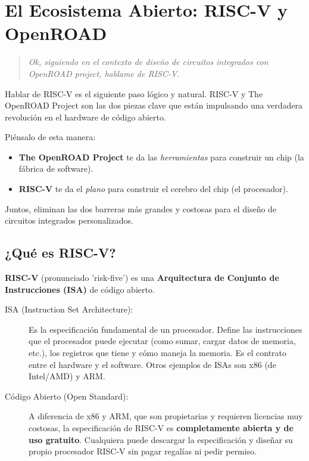 \documentclass[12pt,a4paper]{article}
\newenvironment{pregunta}
  {\begin{leftbar}\begin{quote}\itshape}
  {\end{quote}\end{leftbar}}
\begin{document}
\newpage
\section{El Ecosistema Abierto: RISC-V y OpenROAD}

\begin{pregunta}
Ok, siguiendo en el contexto de diseño de circuitos integrados con OpenROAD project, hablame de RISC-V.
\end{pregunta}

Hablar de RISC-V es el siguiente paso lógico y natural. RISC-V y The OpenROAD Project son las dos piezas clave que están impulsando una verdadera revolución en el hardware de código abierto.

Piénsalo de esta manera:
\begin{itemize}
    \item \textbf{The OpenROAD Project} te da las \textit{herramientas} para construir un chip (la fábrica de software).
    \item \textbf{RISC-V} te da el \textit{plano} para construir el cerebro del chip (el procesador).
\end{itemize}

Juntos, eliminan las dos barreras más grandes y costosas para el diseño de circuitos integrados personalizados.

\subsection{¿Qué es RISC-V?}

\textbf{RISC-V} (pronunciado 'risk-five') es una \textbf{Arquitectura de Conjunto de Instrucciones (ISA)} de código abierto.

\begin{description}
    \item[ISA (Instruction Set Architecture):] Es la especificación fundamental de un procesador. Define las instrucciones que el procesador puede ejecutar (como sumar, cargar datos de memoria, etc.), los registros que tiene y cómo maneja la memoria. Es el contrato entre el hardware y el software. Otros ejemplos de ISAs son x86 (de Intel/AMD) y ARM.
    
    \item[Código Abierto (Open Standard):] A diferencia de x86 y ARM, que son propietarias y requieren licencias muy costosas, la especificación de RISC-V es \textbf{completamente abierta y de uso gratuito}. Cualquiera puede descargar la especificación y diseñar su propio procesador RISC-V sin pagar regalías ni pedir permiso.
\end{description}
\end{document}
